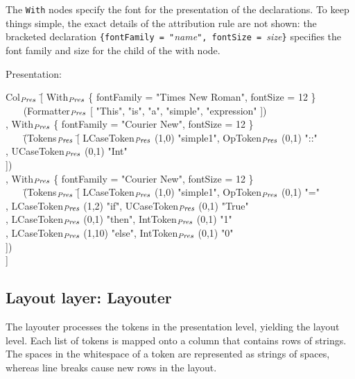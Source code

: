 \documentclass{speauth}
\begin{document}
The \verb|With| nodes specify the font for the presentation of the declarations. To keep things simple, the exact details of the attribution rule are not shown: the bracketed declaration \verb|{fontFamily = "|{\em name}\verb|", fontSize = |{\em size}\verb|}| specifies the font family and size for the child of the with node.

Presentation:
\small \ttfamily
\begin{tabbing}
Col$_{\mathit{Pres}}$ \= [ With$_{\mathit{Pres}}$ \{ fontFamily = "Times New Roman", fontSize = 12 \}\\
       \>  ~~~ (Formatter$_{\mathit{Pres}}$ [ "This", "is", "a", "simple", "expression" ])\\
       \>, With$_{\mathit{Pres}}$ \{ fontFamily = "Courier New", fontSize = 12 \}\\
       \>  ~~~ \= (Tokens$_{\mathit{Pres}}$ \= [ LCaseToken$_{\mathit{Pres}}$ (1,0) "simple1",  OpToken$_{\mathit{Pres}}$ (0,1) "::"\\  
       \>          \>              \> , UCaseToken$_{\mathit{Pres}}$ (0,1) "Int"\\
       \>          \>              \> ])\\
       \>, With$_{\mathit{Pres}}$ \{ fontFamily = "Courier New",  fontSize = 12 \}\\
       \>  ~~~ \= (Tokens$_{\mathit{Pres}}$ \= [ LCaseToken$_{\mathit{Pres}}$ (1,0) "simple1", OpToken$_{\mathit{Pres}}$ (0,1) "="\\
       \>          \>              \> , LCaseToken$_{\mathit{Pres}}$ (1,2) "if", UCaseToken$_{\mathit{Pres}}$ (0,1) "True"\\
       \>          \>              \> , LCaseToken$_{\mathit{Pres}}$ (0,1) "then", IntToken$_{\mathit{Pres}}$ (0,1) "1"\\
       \>          \>              \> , LCaseToken$_{\mathit{Pres}}$ (1,10) "else", IntToken$_{\mathit{Pres}}$ (0,1) "0"\\
       \>          \>              \> ])\\
             \> ]
\end{tabbing}
\rmfamily \normalsize


%																
\subsection{Layout layer: Layouter} \label{sect:layouter}

The layouter processes the tokens in the presentation level, yielding the layout level. Each list of tokens is mapped onto a column that contains rows of strings. The spaces in the whitespace of a token are represented as strings of spaces, whereas line breaks cause new rows in the layout. 
\end{document}
